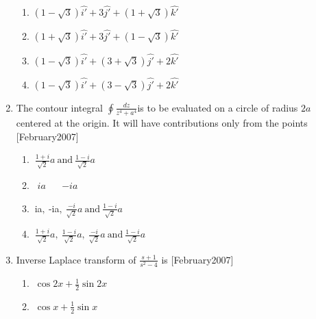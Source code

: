 \documentclass[journal]{IEEEtran}
\begin{document}
\begin{enumerate}
\begin{enumerate}
\item $(1-\sqrt{3})\hat{i'} + 3\hat{j'} + (1+\sqrt{3})\hat{k'}$

\item $(1+\sqrt{3})\hat{i'} + 3\hat{j'} + (1-\sqrt{3})\hat{k'}$

\item $(1-\sqrt{3})\hat{i'} + (3+\sqrt{3})\hat{j'} + 2\hat{k'}$


\item $(1-\sqrt{3})\hat{i'} + (3-\sqrt{3})\hat{j'} + 2\hat{k'}$
\end{enumerate}
\item The contour integral  $\oint \frac{dz}{z^4 + a^4}$is to be evaluated on a circle of radius $2a$ centered at the origin. It will have contributions only from the points \hfill[February2007]
\begin{enumerate}
\item $\ \frac{1+i}{\sqrt{2}}a \ \text{and} \ \frac{1-i}{\sqrt{2}}a$

\item  \ $ia$ \  \ $-ia$
\item $ \ $ia$, \ $-ia$, \ \frac{-i}{\sqrt{2}}a \ \text{and} \ \frac{1-i}{\sqrt{2}}a$
\item $ \ \frac{1+i}{\sqrt{2}}a, \ \frac{1-i}{\sqrt{2}}a, \ \frac{-i}{\sqrt{2}}a \ \text{and} \ \frac{1-i}{\sqrt{2}}a$
\end{enumerate}
\item Inverse Laplace transform of \( \frac{s+1}{s^2 - 4}\) is \hfill[February2007]
\begin{enumerate}
\item $\ \cos 2x + \frac{1}{2}\sin 2x$
\item $ \ \cos x + \frac{1}{2}\sin x$


\end{enumerate}
\end{enumerate}
\end{document}
